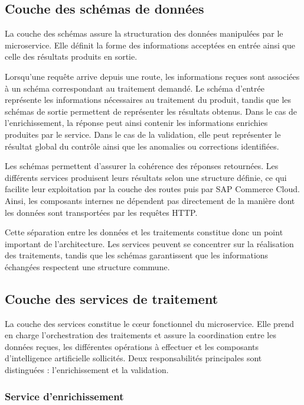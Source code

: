 \subsection{Couche des schémas de données}

La couche des schémas assure la structuration des données manipulées par le microservice. Elle définit la forme des informations acceptées en entrée ainsi que celle des résultats produits en sortie.

Lorsqu'une requête arrive depuis une route, les informations reçues sont associées à un schéma correspondant au traitement demandé. Le schéma d'entrée représente les informations nécessaires au traitement du produit, tandis que les schémas de sortie permettent de représenter les résultats obtenus. Dans le cas de l'enrichissement, la réponse peut ainsi contenir les informations enrichies produites par le service. Dans le cas de la validation, elle peut représenter le résultat global du contrôle ainsi que les anomalies ou corrections identifiées.

Les schémas permettent d'assurer la cohérence des réponses retournées. Les différents services produisent leurs résultats selon une structure définie, ce qui facilite leur exploitation par la couche des routes puis par SAP Commerce Cloud. Ainsi, les composants internes ne dépendent pas directement de la manière dont les données sont transportées par les requêtes HTTP.

Cette séparation entre les données et les traitements constitue donc un point important de l'architecture. Les services peuvent se concentrer sur la réalisation des traitements, tandis que les schémas garantissent que les informations échangées respectent une structure commune.

\subsection{Couche des services de traitement}

La couche des services constitue le cœur fonctionnel du microservice. Elle prend en charge l'orchestration des traitements et assure la coordination entre les données reçues, les différentes opérations à effectuer et les composants d'intelligence artificielle sollicités. Deux responsabilités principales sont distinguées : l'enrichissement et la validation.

\subsubsection{Service d'enrichissement}

